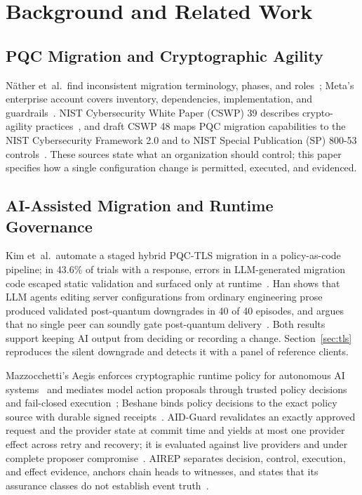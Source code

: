 \section{Background and Related Work}
\label{sec:related}

\subsection{PQC Migration and Cryptographic Agility}
N\"ather et~al.\ find inconsistent migration terminology, phases, and roles~\cite{naether}; Meta's enterprise account covers inventory, dependencies, implementation, and guardrails~\cite{meta}. NIST Cybersecurity White Paper (CSWP) 39 describes crypto-agility practices~\cite{cswp39}, and draft CSWP 48 maps PQC migration capabilities to the NIST Cybersecurity Framework 2.0 and to NIST Special Publication (SP) 800-53 controls~\cite{cswp48}. These sources state what an organization should control; this paper specifies how a single configuration change is permitted, executed, and evidenced.

\subsection{AI-Assisted Migration and Runtime Governance}
Kim et~al.\ automate a staged hybrid PQC-TLS migration in a policy-as-code pipeline; in 43.6\% of trials with a response, errors in LLM-generated migration code escaped static validation and surfaced only at runtime~\cite{kimpqc}. Han shows that LLM agents editing server configurations from ordinary engineering prose produced validated post-quantum downgrades in 40 of 40 episodes, and argues that no single peer can soundly gate post-quantum delivery~\cite{han}. Both results support keeping AI output from deciding or recording a change. Section~\ref{sec:tls} reproduces the silent downgrade and detects it with a panel of reference clients.

Mazzocchetti's Aegis enforces cryptographic runtime policy for autonomous AI systems~\cite{aegis} and mediates model action proposals through trusted policy decisions and fail-closed execution~\cite{mazz2}; Beshane binds policy decisions to the exact policy source with durable signed receipts~\cite{beshane}. AID-Guard revalidates an exactly approved request and the provider state at commit time and yields at most one provider effect across retry and recovery; it is evaluated against live providers and under complete proposer compromise~\cite{aidguard}. AIREP separates decision, control, execution, and effect evidence, anchors chain heads to witnesses, and states that its assurance classes do not establish event truth~\cite{airep}.

